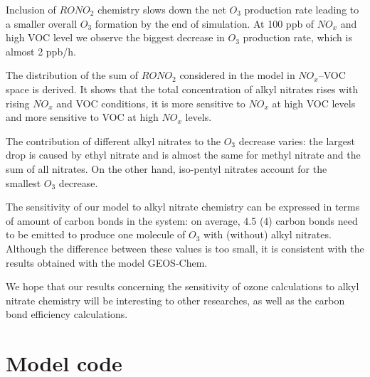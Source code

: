 \documentclass[11pt,a4paper]{article}
\begin{document}
Inclusion of $RONO_2$ chemistry slows down the net $O_3$ production rate leading to a smaller overall $O_3$ formation by the end of simulation. At 100 ppb of $NO_x$ and high VOC level we observe the biggest decrease in $O_3$ production rate, which is almost 2 ppb/h.

The distribution of the sum of $RONO_2$ considered in the model in $NO_x$--VOC space is derived. It shows that the total concentration of alkyl nitrates rises with rising $NO_x$ and VOC conditions, it is more sensitive to $NO_x$ at high VOC levels and more sensitive to VOC at high $NO_x$ levels.

The contribution of different alkyl nitrates to the $O_3$ decrease varies: the largest drop is caused by ethyl nitrate and is almost the same for methyl nitrate and the sum of all nitrates. On the other hand, iso-pentyl nitrates account for the smallest $O_3$ decrease.

The sensitivity of our model to alkyl nitrate chemistry can be expressed in terms of amount of carbon bonds in the system: on average, 4.5 (4) carbon bonds need to be emitted to produce one molecule of $O_3$ with (without) alkyl nitrates. Although the difference between these values is too small, it is consistent with the results obtained with the model GEOS-Chem.

We hope that our results concerning the sensitivity of ozone calculations to alkyl nitrate chemistry will be interesting to other researches, as well as the carbon bond efficiency calculations.


\newpage
\appendix
\section{Model code} \label{sec:appendix1}


\end{document}
